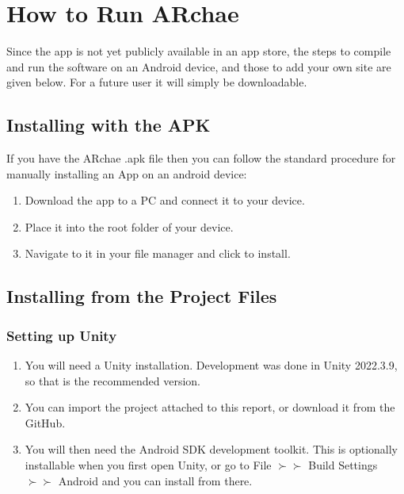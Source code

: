 \documentclass[12pt, a4paper]{article}
\begin{document}
\section{How to Run ARchae}
Since the app is not yet publicly available in an app store, the steps to compile and run the software on an Android device, and those to add your own site are given below. For a future user it will simply be downloadable.

\subsection{Installing with the APK}
If you have the ARchae .apk file then you can follow the standard procedure for manually installing an App on an android device:

\begin{enumerate}
    \item Download the app to a PC and connect it to your device.
    \item Place it into the root folder of your device.
    \item Navigate to it in your file manager and click to install.
\end{enumerate}

\subsection{Installing from the Project Files}

\subsubsection{Setting up Unity}
\begin{enumerate}
    \item You will need a Unity installation. Development was done in Unity 2022.3.9, so that is the recommended version.
    \item You can import the project attached to this report, or download it from the GitHub.
    \item You will then need the Android SDK development toolkit. This is optionally installable when you first open Unity, or go to File $\succ\succ$ Build Settings $\succ\succ$ Android and you can install from there.
\end{enumerate}
\end{document}
